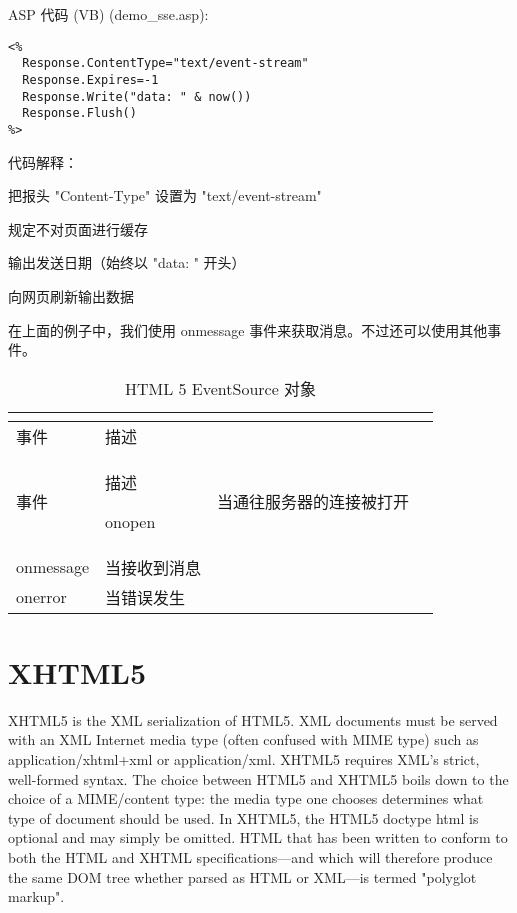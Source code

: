 ASP 代码 (VB) (demo\_sse.asp):

\begin{lstlisting}[language=VBScript]
<%
  Response.ContentType="text/event-stream"
  Response.Expires=-1
  Response.Write("data: " & now())
  Response.Flush()
%>
\end{lstlisting}


代码解释：

\begin{compactitem}
\item 把报头 "Content-Type" 设置为 "text/event-stream"
\item 规定不对页面进行缓存
\item 输出发送日期（始终以 "data: " 开头）
\item 向网页刷新输出数据
\end{compactitem}

在上面的例子中，我们使用 onmessage 事件来获取消息。不过还可以使用其他事件。

\begin{longtable}{|p{120pt}|p{120pt}|}
\tabularnewline\hline
事件		& 描述
\endhead

\caption{HTML 5 EventSource 对象}\\
\hline
事件		& 描述
\endfirsthead

\endfoot

\endlastfoot
\hline
onopen		&当通往服务器的连接被打开\\
\hline
onmessage	&当接收到消息\\
\hline
onerror		&当错误发生\\
\hline
\end{longtable}



\section{XHTML5}


XHTML5 is the XML serialization of HTML5. XML documents must be served with an XML Internet media type (often confused with MIME type) such as application/xhtml+xml or application/xml. XHTML5 requires XML's strict, well-formed syntax. The choice between HTML5 and XHTML5 boils down to the choice of a MIME/content type: the media type one chooses determines what type of document should be used. In XHTML5, the HTML5 doctype html is optional and may simply be omitted. HTML that has been written to conform to both the HTML and XHTML specifications—and which will therefore produce the same DOM tree whether parsed as HTML or XML—is termed "polyglot markup".




